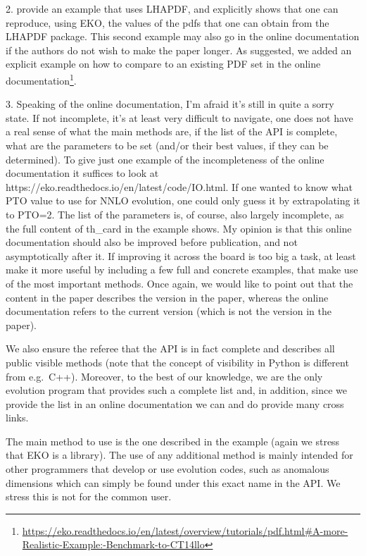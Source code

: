 \documentclass[a4paper,11pt]{article}
\begin{document}
\begin{response}{  
  2. provide an example that uses LHAPDF, and explicitly shows that one
  can reproduce, using EKO, the values of the pdfs that one can obtain
  from the LHAPDF package. This second example may also go in the online
  documentation if the authors do not wish to make the paper longer.
}
As suggested, we added an explicit example on how to compare to an existing PDF set in the online documentation\footnote{\url{https://eko.readthedocs.io/en/latest/overview/tutorials/pdf.html\#A-more-Realistic-Example:-Benchmark-to-CT14llo}}.
\end{response}

\begin{response}{
  3. Speaking of the online documentation, I'm afraid it's still in quite
  a sorry state. If not incomplete, it's at least very difficult to
  navigate, one does not have a real sense of what the main methods are,
  if the list of the API is complete, what are the parameters to be set
  (and/or their best values, if they can be determined). To give just one
  example of the incompleteness of the online documentation it suffices
  to look at https://eko.readthedocs.io/en/latest/code/IO.html. If one
  wanted to know what PTO value to use for NNLO evolution, one could only
  guess it by extrapolating it to PTO=2. The list of the parameters is,
  of course, also largely incomplete, as the full content of th\_card in
  the example shows. My opinion is that this online documentation should
  also be improved before publication, and not asymptotically after it.
  If improving it across the board is too big a task, at least make it
  more useful by including a few full and concrete examples, that make
  use of the most important methods.
}
Once again, we would like to point out that the content in the paper describes the version in the paper,
whereas the online documentation refers to the current version (which is not the version in the paper).

We also ensure the referee that the API is in fact complete and describes all public visible methods
(note that the concept of visibility in Python is different from e.g.\ C++).
Moreover, to the best of our knowledge, we are the only evolution program that provides such a complete list
and, in addition, since we provide the list in an online documentation we can and do provide many cross links.

The main method to use is the one described in the example (again we stress that EKO is a library).
The use of any additional method is mainly intended for other programmers that develop or use evolution codes, such as
anomalous dimensions which can simply be found under this exact name in the API. We stress this is not for the common
user.


\end{response}
\end{document}
